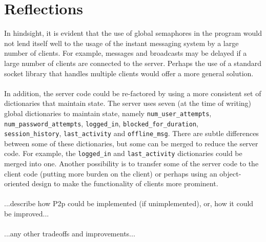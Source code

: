 \documentclass[12pt,a4paper]{article}
\begin{document}
\section{Reflections}
\label{sec:reflections}

In hindsight, it is evident that the use of global semaphores in the program would not lend itself well to the usage of the instant messaging system by a large number of clients. For example, messages and broadcasts may be delayed if a large number of clients are connected to the server. Perhaps the use of a standard socket library that handles multiple clients would offer a more general solution.
\\\\
In addition, the server code could be re-factored by using a more consistent set of dictionaries that maintain state. The server uses seven (at the time of writing) global dictionaries to maintain state, namely	\verb|num_user_attempts|, \verb|num_password_attempts|, \verb|logged_in|, \verb|blocked_for_duration|, \\ \verb|session_history|, \verb|last_activity| and \verb|offline_msg|. There are subtle differences between some of these dictionaries, but some can be merged to reduce the server code. For example, the \verb|logged_in| and \verb|last_activity| dictionaries could be merged into one. Another possibility is to transfer some of the server code to the client code (putting more burden on the client) or perhaps using an object-oriented design to make the functionality of clients more prominent.
\\\\
...describe how P2p could be implemented (if unimplemented), or, how it could be improved...
\\\\
...any other tradeoffs and improvements...
\end{document}
